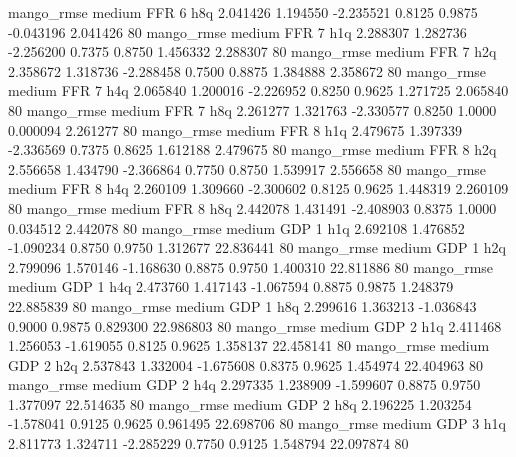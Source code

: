        mango_rmse     medium      FFR                 6                  h8q  2.041426 1.194550 -2.235521 0.8125 0.9875 -0.043196    2.041426 80
       mango_rmse     medium      FFR                 7                  h1q  2.288307 1.282736 -2.256200 0.7375 0.8750  1.456332    2.288307 80
       mango_rmse     medium      FFR                 7                  h2q  2.358672 1.318736 -2.288458 0.7500 0.8875  1.384888    2.358672 80
       mango_rmse     medium      FFR                 7                  h4q  2.065840 1.200016 -2.226952 0.8250 0.9625  1.271725    2.065840 80
       mango_rmse     medium      FFR                 7                  h8q  2.261277 1.321763 -2.330577 0.8250 1.0000  0.000094    2.261277 80
       mango_rmse     medium      FFR                 8                  h1q  2.479675 1.397339 -2.336569 0.7375 0.8625  1.612188    2.479675 80
       mango_rmse     medium      FFR                 8                  h2q  2.556658 1.434790 -2.366864 0.7750 0.8750  1.539917    2.556658 80
       mango_rmse     medium      FFR                 8                  h4q  2.260109 1.309660 -2.300602 0.8125 0.9625  1.448319    2.260109 80
       mango_rmse     medium      FFR                 8                  h8q  2.442078 1.431491 -2.408903 0.8375 1.0000  0.034512    2.442078 80
       mango_rmse     medium      GDP                 1                  h1q  2.692108 1.476852 -1.090234 0.8750 0.9750  1.312677   22.836441 80
       mango_rmse     medium      GDP                 1                  h2q  2.799096 1.570146 -1.168630 0.8875 0.9750  1.400310   22.811886 80
       mango_rmse     medium      GDP                 1                  h4q  2.473760 1.417143 -1.067594 0.8875 0.9875  1.248379   22.885839 80
       mango_rmse     medium      GDP                 1                  h8q  2.299616 1.363213 -1.036843 0.9000 0.9875  0.829300   22.986803 80
       mango_rmse     medium      GDP                 2                  h1q  2.411468 1.256053 -1.619055 0.8125 0.9625  1.358137   22.458141 80
       mango_rmse     medium      GDP                 2                  h2q  2.537843 1.332004 -1.675608 0.8375 0.9625  1.454974   22.404963 80
       mango_rmse     medium      GDP                 2                  h4q  2.297335 1.238909 -1.599607 0.8875 0.9750  1.377097   22.514635 80
       mango_rmse     medium      GDP                 2                  h8q  2.196225 1.203254 -1.578041 0.9125 0.9625  0.961495   22.698706 80
       mango_rmse     medium      GDP                 3                  h1q  2.811773 1.324711 -2.285229 0.7750 0.9125  1.548794   22.097874 80
